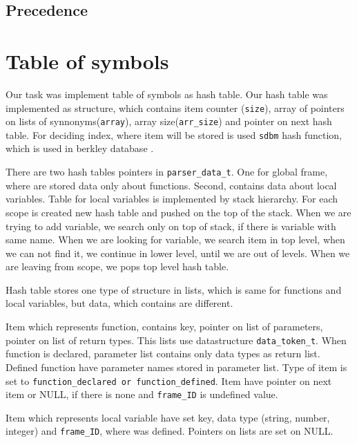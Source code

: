 \documentclass[11pt]{article}
\begin{document}
\subsection{Precedence}

\section{Table of symbols}
Our task was implement table of symbols as hash table. Our hash table was implemented as structure, which contains item counter (\texttt{size}), array of pointers on lists of synnonyms(\texttt{array}),
array size(\texttt{arr\_size}) and pointer on next hash table. For deciding index, where item will be stored is used \texttt{sdbm} hash function, which is used in berkley database \cite{hash_function}. 

There are two hash tables pointers in \texttt{parser\_data\_t}. One for global frame, where are stored data only about functions. Second, contains data about local variables. Table for local variables is implemented by
stack hierarchy. For each scope is created new hash table and pushed on the top of the stack. When we are trying to add variable, we search only on top of stack, if there is variable with same name. When we are looking for variable, we search item in top level, 
when we can not find it, we continue in lower level, until we are out of levels. When we are leaving from scope, we pops top level hash table.

Hash table stores one type of structure in lists, which is same for functions and local variables, but data, which contains are different.

Item which represents function, contains key, pointer on list of parameters, pointer on list of return types. This lists use datastructure \texttt{data\_token\_t}. When function
is declared, parameter list contains only data types as return list. Defined function have parameter names stored in parameter list. Type of item is set to \texttt{function\_declared or function\_defined}.
Item have pointer on next item or NULL, if there is none and \texttt{frame\_ID} is undefined value.

Item which represents local variable have set key, data type (string, number, integer) and \texttt{frame\_ID}, where was defined. Pointers on lists are set on NULL.
\end{document}
